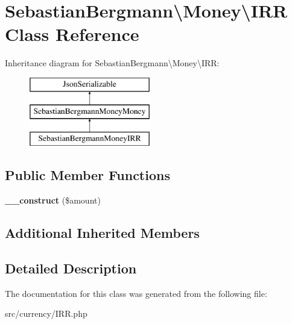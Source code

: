 \hypertarget{classSebastianBergmann_1_1Money_1_1IRR}{}\section{Sebastian\+Bergmann\textbackslash{}Money\textbackslash{}I\+R\+R Class Reference}
\label{classSebastianBergmann_1_1Money_1_1IRR}
Inheritance diagram for Sebastian\+Bergmann\textbackslash{}Money\textbackslash{}I\+R\+R\+:\begin{figure}[H]
\begin{center}
\leavevmode
\includegraphics[height=3.000000cm]{classSebastianBergmann_1_1Money_1_1IRR}
\end{center}
\end{figure}
\subsection*{Public Member Functions}
\begin{DoxyCompactItemize}
\item 
\hypertarget{classSebastianBergmann_1_1Money_1_1IRR_ae3ddc339794fa686e41fad590073dbea}{}{\bfseries \+\_\+\+\_\+construct} (\$amount)\label{classSebastianBergmann_1_1Money_1_1IRR_ae3ddc339794fa686e41fad590073dbea}

\end{DoxyCompactItemize}
\subsection*{Additional Inherited Members}


\subsection{Detailed Description}


The documentation for this class was generated from the following file\+:\begin{DoxyCompactItemize}
\item 
src/currency/I\+R\+R.\+php\end{DoxyCompactItemize}
